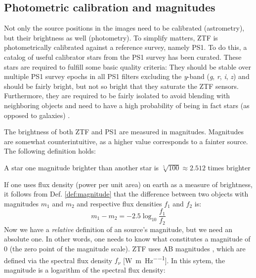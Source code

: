 \subsection{Photometric calibration and magnitudes} \label{magnitudes}
Not only the source positions in the images need to be calibrated (astrometry), but their brightness as well (photometry). To simplify matters, ZTF is photometrically calibrated against a reference survey, namely PS1. To do this, a catalog of useful calibrator stars from the PS1 survey has been curated. These stars are required to fulfill some basic quality criteria: They should be stable over multiple PS1 survey epochs in all PS1 filters excluding the \textit{y}-band (\textit{g}, \textit{r}, \textit{i}, \textit{z}) and should be fairly bright, but not so bright that they saturate the ZTF sensors. Furthermore, they are required to be fairly isolated to avoid blending with neighboring objects and need to have a high probability of being in fact stars (as opposed to galaxies) \cite{Masci2019a}.

The brightness of both ZTF and PS1 are measured in magnitudes. Magnitudes are somewhat counterintuitive, as a higher value corresponds to a fainter source. The following definition holds:

\begin{definition}
A star one magnitude brighter than another star is $\sqrt[5]{100} \approx 2.512$ times brighter
\end{definition}
If one uses flux density (power per unit area) on earth as a measure of brightness, it follows from Def. \ref{def:magnitude} that the difference between two objects with magnitudes $m_1$ and $m_2$ and respective flux densities $f_1$ and $f_2$ is:
\begin{equation}
m_1 - m_2 = -2.5 \log_{10}{\frac{f_1}{f_2}}
\end{equation}
Now we have a \textit{relative} definition of an source's magnitude, but we need an absolute one. In other words, one needs to know what constitutes a magnitude of 0 (the zero point of the magnitude scale). ZTF uses AB magnitudes , which are defined via the spectral flux density $f_\nu$ [\unit{\W\per\m\per\Hz}]. In this sytem, the magnitude is a logarithm of the spectral flux density: 

